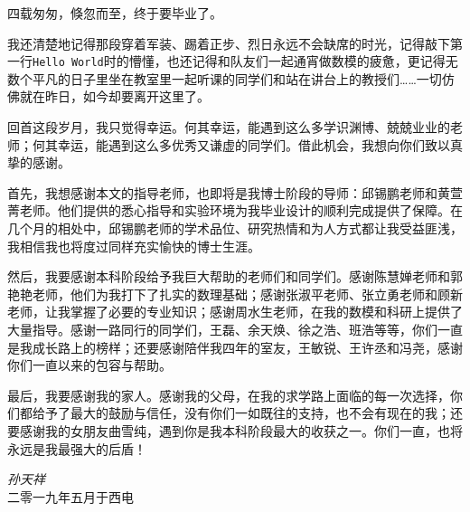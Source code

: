 
\begin{acknowledgments}

四载匆匆，倏忽而至，终于要毕业了。

我还清楚地记得那段穿着军装、踢着正步、烈日永远不会缺席的时光，记得敲下第一行\texttt{Hello World}时的懵懂，也还记得和队友们一起通宵做数模的疲惫，更记得无数个平凡的日子里坐在教室里一起听课的同学们和站在讲台上的教授们……一切仿佛就在昨日，如今却要离开这里了。

回首这段岁月，我只觉得幸运。何其幸运，能遇到这么多学识渊博、兢兢业业的老师；何其幸运，能遇到这么多优秀又谦虚的同学们。借此机会，我想向你们致以真挚的感谢。

首先，我想感谢本文的指导老师，也即将是我博士阶段的导师：邱锡鹏老师和黄萱菁老师。他们提供的悉心指导和实验环境为我毕业设计的顺利完成提供了保障。在几个月的相处中，邱锡鹏老师的学术品位、研究热情和为人方式都让我受益匪浅，我相信我也将度过同样充实愉快的博士生涯。

然后，我要感谢本科阶段给予我巨大帮助的老师们和同学们。感谢陈慧婵老师和郭艳艳老师，他们为我打下了扎实的数理基础；感谢张淑平老师、张立勇老师和顾新老师，让我掌握了必要的专业知识；感谢周水生老师，在我的数模和科研上提供了大量指导。感谢一路同行的同学们，王磊、余天焕、徐之浩、班浩等等，你们一直是我成长路上的榜样；还要感谢陪伴我四年的室友，王敏锐、王许丞和冯尧，感谢你们一直以来的包容与帮助。

最后，我要感谢我的家人。感谢我的父母，在我的求学路上面临的每一次选择，你们都给予了最大的鼓励与信任，没有你们一如既往的支持，也不会有现在的我；还要感谢我的女朋友曲雪纯，遇到你是我本科阶段最大的收获之一。你们一直，也将永远是我最强大的后盾！

\begin{flushright}
	\emph{孙天祥}\\
	二零一九年五月于西电
\end{flushright}

\end{acknowledgments}

